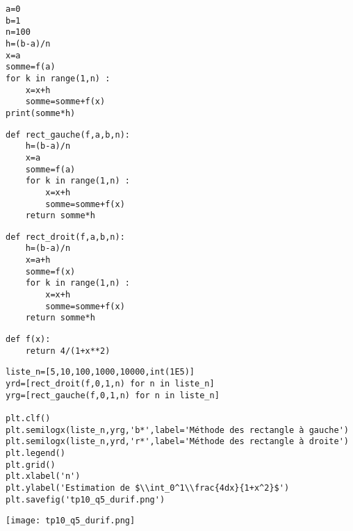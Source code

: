 
\question{}

\begin{lstlisting}
a=0
b=1
n=100
h=(b-a)/n
x=a
somme=f(a)
for k in range(1,n) :
    x=x+h
    somme=somme+f(x)
print(somme*h)

\end{lstlisting}

\question{} 

\begin{lstlisting}
def rect_gauche(f,a,b,n):
    h=(b-a)/n
    x=a
    somme=f(a)
    for k in range(1,n) :
        x=x+h
        somme=somme+f(x)
    return somme*h

\end{lstlisting}

\question{}


\begin{lstlisting}
def rect_droit(f,a,b,n):
    h=(b-a)/n
    x=a+h
    somme=f(x)
    for k in range(1,n) :
        x=x+h
        somme=somme+f(x)
    return somme*h

\end{lstlisting}

\question{} 

\begin{lstlisting}
def f(x):
    return 4/(1+x**2)
\end{lstlisting}

\question{}


\begin{minipage}{0.5\textwidth}
\begin{lstlisting}
liste_n=[5,10,100,1000,10000,int(1E5)]
yrd=[rect_droit(f,0,1,n) for n in liste_n]
yrg=[rect_gauche(f,0,1,n) for n in liste_n]

plt.clf()
plt.semilogx(liste_n,yrg,'b*',label='Méthode des rectangle à gauche')
plt.semilogx(liste_n,yrd,'r*',label='Méthode des rectangle à droite')
plt.legend()
plt.grid()
plt.xlabel('n')
plt.ylabel('Estimation de $\\int_0^1\\frac{4dx}{1+x^2}$')
plt.savefig('tp10_q5_durif.png')
\end{lstlisting}
\end{minipage}
\begin{minipage}{0.5\textwidth}
\texttt{[image: tp10\_q5\_durif.png]}
\end{minipage}



\question{}




\question{} 

